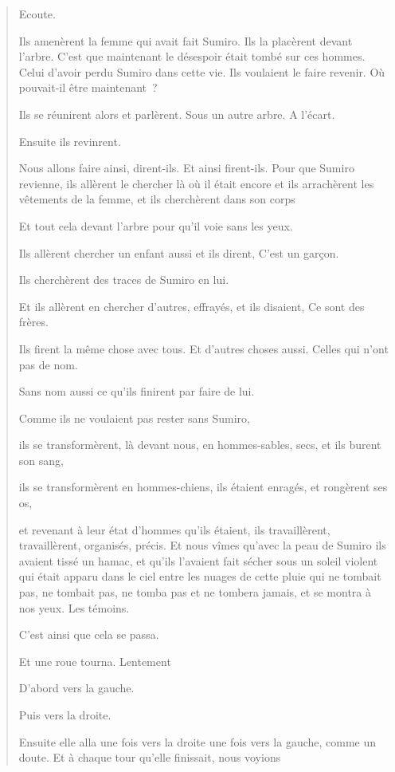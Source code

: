 \begin{quote}
Ecoute.

Ils amenèrent la femme qui avait fait Sumiro. Ils la placèrent devant
l'arbre. C'est que maintenant le désespoir était tombé sur ces hommes.
Celui d'avoir perdu Sumiro dans cette vie. Ils voulaient le faire
revenir. Où pouvait-il être maintenant~?

Ils se réunirent alors et parlèrent. Sous un autre arbre. A l'écart.

Ensuite ils revinrent.

Nous allons faire ainsi, dirent-ils. Et ainsi firent-ils. Pour que
Sumiro revienne, ils allèrent le chercher là où il était encore et ils
arrachèrent les vêtements de la femme, et ils cherchèrent dans son corps

Et tout cela devant l'arbre pour qu'il voie sans les yeux.

Ils allèrent chercher un enfant aussi et ils dirent, C'est un garçon.

Ils cherchèrent des traces de Sumiro en lui.

Et ils allèrent en chercher d'autres, effrayés, et ils disaient, Ce sont
des frères.

Ils firent la même chose avec tous. Et d'autres choses aussi. Celles qui
n'ont pas de nom.

Sans nom aussi ce qu'ils finirent par faire de lui.

Comme ils ne voulaient pas rester sans Sumiro,

ils se transformèrent, là devant nous, en hommes-sables, secs, et ils
burent son sang,

ils se transformèrent en hommes-chiens, ils étaient enragés, et
rongèrent ses os,

et revenant à leur état d'hommes qu'ils étaient, ils travaillèrent,
travaillèrent, organisés, précis. Et nous vîmes qu'avec la peau de
Sumiro ils avaient tissé un hamac, et qu'ils l'avaient fait sécher sous
un soleil violent qui était apparu dans le ciel entre les nuages de
cette pluie qui ne tombait pas, ne tombait pas, ne tomba pas et ne
tombera jamais, et se montra à nos yeux. Les témoins.

C'est ainsi que cela se passa.

Et une roue tourna. Lentement

D'abord vers la gauche.

Puis vers la droite.

Ensuite elle alla une fois vers la droite une fois vers la gauche, comme
un doute. Et à chaque tour qu'elle finissait, nous voyions


\end{quote}
